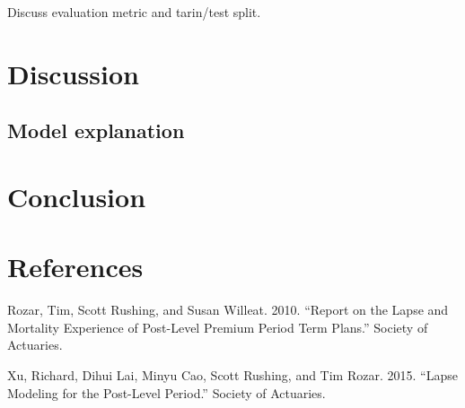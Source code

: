 \documentclass[]{elsarticle} %
\begin{document}
Discuss evaluation metric and tarin/test split.

\hypertarget{discussion}{%
\section{Discussion}\label{discussion}}

\hypertarget{model-explanation}{%
\subsection{Model explanation}\label{model-explanation}}

\hypertarget{conclusion}{%
\section{Conclusion}\label{conclusion}}

\hypertarget{references}{%
\section*{References}\label{references}}

\hypertarget{refs}{}
\leavevmode\hypertarget{ref-soa2010}{}%
Rozar, Tim, Scott Rushing, and Susan Willeat. 2010. ``Report on the
Lapse and Mortality Experience of Post-Level Premium Period Term
Plans.'' Society of Actuaries.

\leavevmode\hypertarget{ref-soa2015}{}%
Xu, Richard, Dihui Lai, Minyu Cao, Scott Rushing, and Tim Rozar. 2015.
``Lapse Modeling for the Post-Level Period.'' Society of Actuaries.
\end{document}
